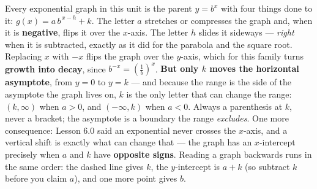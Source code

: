 \documentclass[10pt]{article}
\begin{document}
\vspace{0.10in}

\begin{remindbox}
\small Every exponential graph in this unit is the parent $y=b^{x}$ with four things done to it:
$g(x)=a\,b^{\,x-h}+k$. The letter $a$ stretches or compresses the graph and, when it is
\textbf{negative}, flips it over the $x$-axis. The letter $h$ slides it sideways --- \emph{right} when
it is subtracted, exactly as it did for the parabola and the square root. Replacing $x$ with $-x$
flips the graph over the $y$-axis, which for this family turns \textbf{growth into decay}, since
$b^{-x}=\left(\frac1b\right)^{x}$. \textbf{But only $k$ moves the horizontal asymptote}, from $y=0$ to
$y=k$ --- and because the range is the side of the asymptote the graph lives on, $k$ is the only
letter that can change the range: $(k,\infty)$ when $a>0$, and $(-\infty,k)$ when $a<0$. Always a
parenthesis at $k$, never a bracket; the asymptote is a boundary the range \emph{excludes}. One more
consequence: Lesson 6.0 said an exponential never crosses the $x$-axis, and a vertical shift is
exactly what can change that --- the graph has an $x$-intercept precisely when $a$ and $k$ have
\textbf{opposite signs}. Reading a graph backwards runs in the same order: the dashed line gives $k$,
the $y$-intercept is $a+k$ (so subtract $k$ before you claim $a$), and one more point gives $b$.
\end{remindbox}
\end{document}
